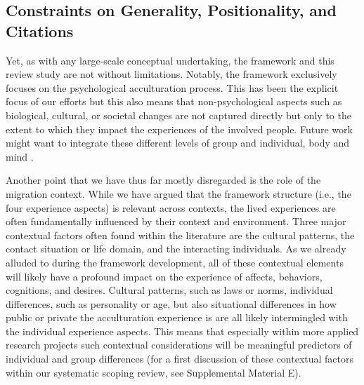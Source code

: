 \documentclass[man, 12pt, a4paper, mask]{apa7}
\begin{document}
\subsection{Constraints on Generality, Positionality, and Citations}
Yet, as with any large-scale conceptual undertaking, the framework and this review study are not without limitations. Notably, the framework exclusively focuses on the psychological acculturation process. This has been the explicit focus of our efforts but this also means that non-psychological aspects such as biological, cultural, or societal changes are not captured directly but only to the extent to which they impact the experiences of the involved people. Future work might want to integrate these different levels of group and individual, body and mind \citep[e.g.,][]{Eronen2021}. 

Another point that we have thus far mostly disregarded is the role of the migration context. While we have argued that the framework structure (i.e., the four experience aspects) is relevant across contexts, the lived experiences are often fundamentally influenced by their context and environment. Three major contextual factors often found within the literature are the cultural patterns, the contact situation or life domain, and the interacting individuals. As we already alluded to during the framework development, all of these contextual elements will likely have a profound impact on the experience of affects, behaviors, cognitions, and desires. Cultural patterns, such as laws or norms, individual differences, such as personality or age, but also situational differences in how public or private the acculturation experience is are all likely intermingled with the individual experience aspects. This means that especially within more applied research projects such contextual considerations will be meaningful predictors of individual and group differences (for a first discussion of these contextual factors within our systematic scoping review, see Supplemental Material E). 
\end{document}
